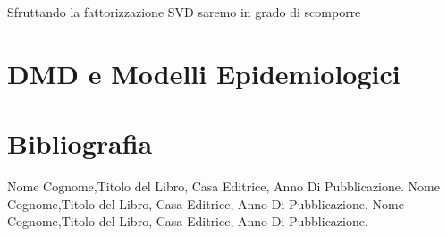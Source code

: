 \documentclass[11pt]{article}
\begin{document}
Sfruttando la fattorizzazione SVD saremo in grado di scomporre 

\section{DMD e Modelli Epidemiologici}

\newpage
\section{Bibliografia}
\begin{thebibliography}{99}
 Nome Cognome,Titolo del Libro, Casa Editrice, Anno Di Pubblicazione.
 Nome Cognome,Titolo del Libro, Casa Editrice, Anno Di Pubblicazione.
 Nome Cognome,Titolo del Libro, Casa Editrice, Anno Di Pubblicazione.
\end{thebibliography}

\printindex
\end{document}

